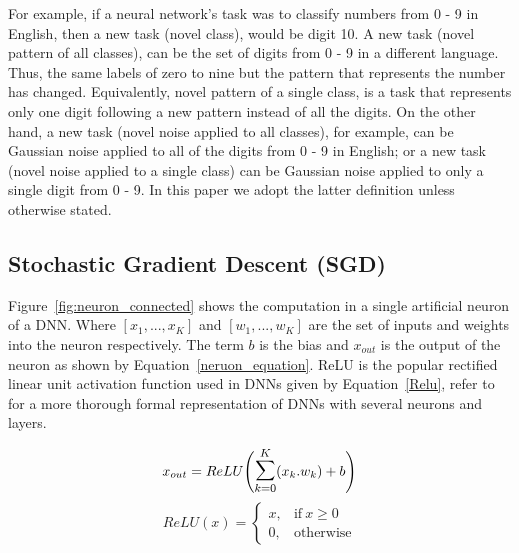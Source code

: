 For example, if a neural network's task was to classify numbers from 0 - 9 in English, then a new task (novel class), would be digit 10.
%
A new task (novel pattern of all classes), can be the set of digits from 0 - 9 in a different language. Thus, the same labels of zero to nine but the pattern that represents the number has changed.
%
Equivalently, novel pattern of a single class, is a task that represents only one digit following a new pattern instead of all the digits.  
%
On the other hand, a new task (novel noise applied to all classes), for example, can be Gaussian noise applied to all of the digits from 0 - 9 in English; or a new task (novel noise applied to a single class) can be Gaussian noise applied to only a single digit from 0 - 9.  In this paper we adopt the latter definition unless otherwise stated.  




\subsection{Stochastic Gradient Descent (SGD)}\label{sec:gradient_decent}
Figure~\ref{fig:neuron_connected} shows the computation in a single artificial neuron of a DNN.
%
Where $[x_1, ..., x_K]$ and $[w_1,... ,w_K]$ are the set of inputs and weights into the neuron respectively. The term $b$ is the bias and $x_{out}$ is the output of the neuron as shown by Equation~\ref{neruon_equation}.
ReLU is the popular rectified linear unit activation function used in DNNs given by Equation~\ref{Relu}, refer to ~\cite{Huang2020b} for a more thorough formal representation of DNNs with several neurons and layers. 



\begin{equation} 
 x_{out} = ReLU \Bigg(\mathlarger{\mathlarger{\sum}}_{k=0}^{K} (x_{k}.w_{k})+b \Bigg)
 \label{neruon_equation}
\end{equation}
\begin{equation} 
    ReLU(x) = 
        \begin{cases}
          x, & \text{if}\ x\geq0 \\
          0, & \text{otherwise}
        \end{cases}
\label{Relu}
\end{equation}


